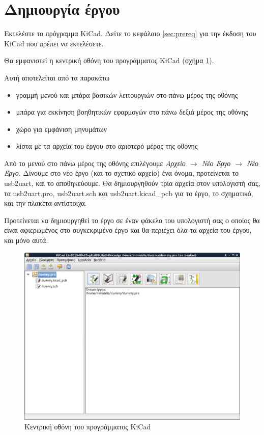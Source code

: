 \documentclass[a4paper]{article}
\begin{document}
\newpage
\section{Δημιουργία έργου}
Εκτελέστε το πρόγραμμα \textenglish{KiCad}. Δείτε το κεφάλαιο \ref{sec:prereq} για την έκδοση του \textenglish{KiCad} που πρέπει να εκτελέσετε.

Θα εμφανιστεί η κεντρική οθόνη του προγράμματος \textenglish{KiCad} (σχήμα \ref{fig:kicad-main-window}). 

Αυτή αποτελείται από τα παρακάτω
\begin{itemize}
    \item γραμμή μενού και μπάρα βασικών λειτουργιών στο πάνω μέρος της οθόνης
    \item μπάρα για εκκίνηση βοηθητικών εφαρμογών στο πάνω δεξιά μέρος της οθόνης
    \item χώρο για εμφάνιση μηνυμάτων
    \item λίστα με τα αρχεία του έργου στο αριστερό μέρος της οθόνης
\end{itemize}

Από το μενού στο πάνω μέρος της οθόνης επιλέγουμε \textit{Αρχείο $\rightarrow$ Νέο Έργο $\rightarrow$ Νέο Έργο}. Δίνουμε στο νέο έργο (και το σχετικό αρχείο) ένα όνομα, προτείνεται το usb2uart, και το αποθηκεύουμε. Θα δημιουργηθούν τρία αρχεία στον υπολογιστή σας, τα usb2uart.pro, usb2uart.sch και usb2uart.kicad\_pcb για το έργο, το σχηματικό, και την πλακέτα αντίστοιχα.

Προτείνεται να δημιουργηθεί το έργο σε έναν φάκελο του υπολογιστή σας ο οποίος θα είναι αφιερωμένος στο συγκεκριμένο έργο και θα περιέχει όλα τα αρχεία του έργου, και μόνο αυτά.

\begin{figure}
  \begin{center}
    \includegraphics[width=.9\textwidth]{img/kicad-main-window.png}
    \caption{Κεντρική οθόνη του προγράμματος KiCad}
    \label{fig:kicad-main-window}
  \end{center}
\end{figure}
\end{document}
